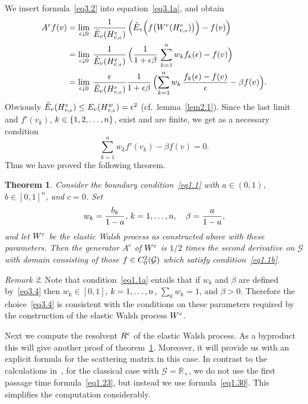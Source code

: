\documentclass[11pt,a4paper]{amsart}
\newcommand{\gb}{\beta}
\newcommand{\gep}{\epsilon}
\newcommand{\cG}{\mathcal{G}}
\newcommand{\1}{1}
\newcommand{\R}{\mathbb{R}}
\newtheorem{theorem}{Theorem}[section]
\theoremstyle{remark}
\newtheorem{remark}[theorem]{Remark}
\newcommand{\sn}{\ensuremath\{1,2,\dotsc,n\}}
\newcommand{\da}{\ensuremath\downarrow}
\newcommand{\Cii}{\ensuremath C_0^2(\cG)}
\newcommand{\kn}{\ensuremath k=1,\dotsc,n}
\newcommand{\TW}{\ensuremath H^w}
\newcommand{\We}{\ensuremath W^e}
\newcommand{\ReW}{\ensuremath R^e}
\newcommand{\TeW}{\ensuremath H^e}
\newcommand{\hE}{\ensuremath{\hat E}}
\numberwithin{equation}{section}
\begin{document}
We insert formula~\eqref{eq3.2} into equation~\eqref{eq3.1a}, and obtain
\begin{align*}
    A^e f(v)
        &=  \lim_{\gep\da 0}\, \frac{1}{\hE_v(\TeW_{v,\gep})}
                \,\Bigr(\hE_v\Bigl(f\bigl(\We(\TeW_{v,\gep})\bigr)\Bigr) - f(v)\Bigl)\\
        &=  \lim_{\gep\da 0}\, \frac{1}{\hE_v(\TeW_{v,\gep})}
                \,\Bigl(\frac{1}{1+\gep\gb}\,\sum_{k=1}^n w_k f_k(\gep) - f(v)\Bigr)\\
        &=  \lim_{\gep\da 0}\, \frac{\gep}{\hE_v(\TeW_{v,\gep})}
                \frac{1}{1+\gep\gb}\,\Bigl(\sum_{k=1}^n w_k\,\frac{f_k(\gep)-f(v)}{\gep}
                    -\gb f(v)\Bigr).
\end{align*}
Obviously $\hE_v(\TeW_{v,\gep})\le E_v(\TW_{v,\gep})=\gep^2$ (cf.~lemma~\ref{lem2.1}).
Since the last limit and $f'(v_k)$, $k\in\sn$, exist and are finite, we get as a necessary
condition
\begin{equation}    \label{eq3.3}
    \sum_{k=1}^n w_k f'(v_k) - \gb f(v) =0.
\end{equation}
Thus we have proved the following theorem.

\begin{theorem} \label{thm3.2}
Consider the boundary condition~\eqref{eq1.1} with $a\in(0,1)$,
$b\in [0,1]^n$, and $c=0$. Set
\begin{equation}    \label{eq3.4}
    w_k = \frac{b_k}{1-a},\,\kn,\quad \gb = \frac{a}{1-a},
\end{equation}
and let $\We$ be the elastic Walsh process as constructed above with these
parameters. Then the generator $A^e$ of $\We$ is $1/2$ times the second derivative
on $\cG$ with
domain consisting of those $f\in\Cii$ which satisfy condition~\eqref{eq1.1b}.
\end{theorem}

\begin{remark}  \label{rem3.3a}
Note that condition~\eqref{eq1.1a} entails that if $w_k$ and $\gb$ are defined
by~\eqref{eq3.4} then $w_k\in [0,1]$, $\kn$, $\sum_k w_k=1$, and $\gb>0$. Therefore
the choice~\eqref{eq3.4} is consistent with the conditions on these parameters
required by the construction of the elastic Walsh process $\We$.
\end{remark}

Next we compute the resolvent $\ReW$ of the elastic Walsh process. As a byproduct this
will give another proof of theorem~\ref{thm3.2}. Moreover, it will provide us
with an explicit formula for the scattering matrix in this case. In contrast to the
calculations in~\cite[Chapter~2.3]{ItMc74}, \cite[Chapter~6.2]{Kn81} for the
classical case with $\cG=\R_+$, we do not use the first passage time
formula~\eqref{eq1.23}, but instead we use formula~\eqref{eq1.30}. This simplifies
the computation considerably.
\end{document}
